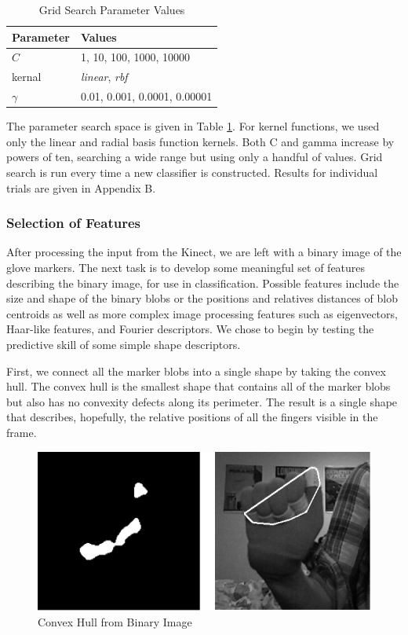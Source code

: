 \documentclass[12pt]{article}
\begin{document}
\begin{table}[H]
\centering
\caption{Grid Search Parameter Values}
\label{table:gridsearch}
\begin{tabular}{ |l|l| }
\hline
\textbf{Parameter} & \textbf{Values} \\ \hline
\( C \) &  1, 10, 100, 1000, 10000 \\ \hline
kernal & \textit{linear}, \textit{rbf} \\ \hline
\( \gamma \) & 0.01, 0.001, 0.0001, 0.00001 \\ 
\hline
\end{tabular}
\end{table}

The parameter search space is given in Table \ref{table:gridsearch}. For kernel functions, we used only the linear and radial basis function kernels. Both C and gamma increase by powers of ten, searching a wide range but using only a handful of values. Grid search is run every time a new classifier is constructed. Results for individual trials are given in Appendix B.

\subsubsection{Selection of Features}
After processing the input from the Kinect, we are left with a binary image of the glove markers. The next task is to develop some meaningful set of features describing the binary image, for use in classification. Possible features include the size and shape of the binary blobs or the positions and relatives distances of blob centroids as well as more complex image processing features such as eigenvectors, Haar-like features, and Fourier descriptors. We chose to begin by testing the predictive skill of some simple shape descriptors.

First, we connect all the marker blobs into a single shape by taking the convex hull. The convex hull is the smallest shape that contains all of the marker blobs but also has no convexity defects along its perimeter. The result is a single shape that describes, hopefully, the relative positions of all the fingers visible in the frame. 

\begin{figure}[h]
  \centering
  \includegraphics[scale=1]{Hull.png}
  \caption{Convex Hull from Binary Image}
  \label{fig:hull}
\end{figure}
\end{document}
